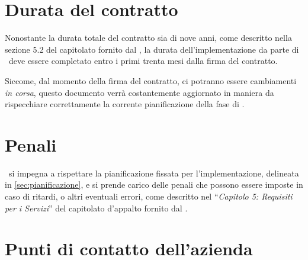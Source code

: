 %	
%	
	
	
\section{Durata del contratto}
	
	Nonostante la durata totale del contratto sia di nove anni, come descritto nella sezione 5.2 del capitolato fornito dal \proponente, la durata dell'implementazione da parte di \azienda~deve essere completato entro i primi trenta mesi dalla firma del contratto.
	
	Siccome, dal momento della firma del contratto, ci potranno essere cambiamenti \textit{in corsa}, questo documento verrà costantemente aggiornato in maniera da rispecchiare correttamente la corrente pianificazione della fase di \rollout.

	
\section{Penali}

	\azienda~si impegna a rispettare la pianificazione fissata per l'implementazione, delineata in \ref{sec:pianificazione}, e si prende carico delle penali che possono essere imposte in caso di ritardi, o altri eventuali errori, come descritto nel ``\textit{Capitolo 5: Requisiti per i Servizi}'' del capitolato d'appalto fornito dal \proponente.
	
\section{Punti di contatto dell'azienda}

